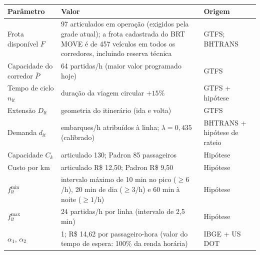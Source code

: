\begin{tabular}{p{3.4cm}p{8.0cm}p{2.6cm}}
\toprule
Parâmetro & Valor & Origem \\
\midrule
Frota disponível $F$ & 97 articulados em operação (exigidos pela grade atual); a frota cadastrada do BRT MOVE é de 457 veículos em todos os corredores, incluindo reserva técnica & GTFS; BHTRANS \\
Capacidade do corredor $\bar{P}$ & 64 partidas/h (maior valor programado hoje) & GTFS \\
Tempo de ciclo $n_{lt}$ & duração da viagem circular $+15\%$ & GTFS + hipótese \\
Extensão $D_{lt}$ & geometria do itinerário (ida e volta) & GTFS \\
Demanda $d_{lt}$ & embarques/h atribuídos à linha; $\lambda=0{,}435$ (calibrado) & BHTRANS + hipótese de rateio \\
Capacidade $C_k$ & articulado 130; Padron 85 passageiros & Hipótese \\
Custo por km & articulado R\$ 12{,}50; Padron R\$ 9{,}50 & Hipótese \\
$f^{\min}_{lt}$ & intervalo máximo de 10 min no pico ($\ge6$/h), 20 min de dia ($\ge3$/h) e 60 min à noite ($\ge1$/h) & Hipótese \\
$f^{\max}_{lt}$ & 24 partidas/h por linha (intervalo de 2,5 min) & Hipótese \\
$\alpha_1$, $\alpha_2$ & 1; R\$ 14{,}62 por passageiro-hora (valor do tempo de espera: 100\% da renda horária) & IBGE + US DOT \\
\bottomrule
\end{tabular}

